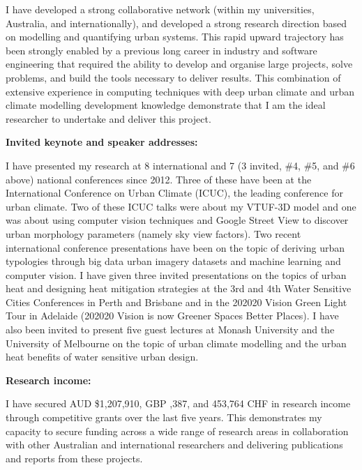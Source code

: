I have developed a strong collaborative network (within my universities, Australia, and internationally), and developed a strong research direction based on modelling and quantifying urban systems. This rapid upward trajectory has been strongly enabled by a previous long career in industry and software engineering that required the ability to develop and organise large projects, solve problems, and build the tools necessary to deliver results. This combination of extensive experience in computing techniques with deep urban climate and urban climate modelling development knowledge demonstrate that I am the ideal researcher to undertake and deliver this project.


\textbf{Invited keynote and speaker addresses:}

I have presented my research at 8 international and 7 (3 invited, \#4, \#5, and \#6 above) national conferences since 2012. Three of these have been at the International Conference on Urban Climate (ICUC), the leading conference for urban climate. Two of these ICUC talks were about my VTUF-3D model and one was about using computer vision techniques and Google Street View to discover urban morphology parameters (namely sky view factors). Two recent international conference presentations have been on the topic of deriving urban typologies through big data urban imagery datasets and machine learning and computer vision. I have given three invited presentations on the topics of urban heat and designing heat mitigation strategies at the 3rd and 4th Water Sensitive Cities Conferences in Perth and Brisbane and in the 202020 Vision Green Light Tour in Adelaide (202020 Vision is now Greener Spaces Better Places). I have also been invited to present five guest lectures at Monash University and the University of Melbourne on the topic of urban climate modelling and the urban heat benefits of water sensitive urban design. 

\textbf{Research income:}

I have secured AUD \$1,207,910, GBP ,387, and 453,764 CHF in research income through competitive grants over the last five years. This demonstrates my capacity to secure funding across a wide range of research areas in collaboration with other Australian and international researchers and delivering publications and reports from these projects.


